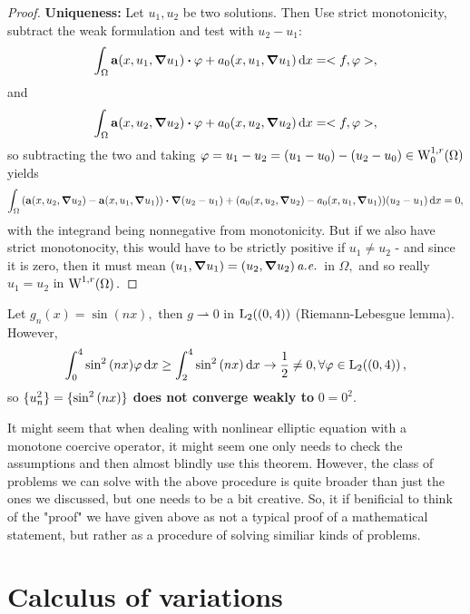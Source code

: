 \documentclass{article}
\begin{document}
\begin{proof}
	\textbf{Uniqueness:} Let $u_1, u_2$ be two solutions. Then Use strict monotonicity, subtract the weak formulation and test with $u_2-u_1$:
	\[
		\int_{\Omega}\vb{a}\qty(x, u_1, \grad u_1)\vdot \varphi + a_0\qty(x, u_1, \grad u_1)\dd{x} = <f, \varphi>,
	\]
	and
	\[
		\int_{\Omega}\vb{a}\qty(x, u_2, \grad u_2)\vdot \varphi + a_0\qty(x, u_2, \grad u_2)\dd{x} = <f, \varphi>,
	\]
so subtracting the two and taking $\varphi = u_1 - u_2 = \qty(u_1 - u_0) - \qty(u_2 - u_0) \in \WkpzeroSet[1][r]{\Omega}$ yields
	\[
		\int_{\Omega}\qty(\vb{a}\qty(x, u_2, \grad u_2)-\vb{a}\qty(x, u_1, \grad u_1))\vdot \grad\qty(u_2 - u_1)+\qty(a_0\qty(x, u_2, \grad u_2)-a_0\qty(x, u_1, \grad u_1))\qty(u_2-u_1)\dd{x} =0,
	\]
	with the integrand being nonnegative from monotonicity. But if we also have strict monotonocity, this would have to be strictly positive if $u_1 \neq u_2$ - and since it is zero, then it must mean $\qty(u_1, \grad u_1) = \qty(u_2, \grad u_2) \, \text{\textit{a.e.}} \,$ in $\Omega,$ and so really $u_1 = u_2$ in $\WkpSet[1][r]{\Omega}.$
\end{proof}
\begin{example}
	Let $g_n(x) = \sin(nx), $ then $g \rightharpoonup 0$ in $\LpSet[2]{(0,4)}$ (Riemann-Lebesgue lemma). However,
	\[
		\int_0^4 \sin^{2}\qty(nx)\varphi \dd{x} \geq \int_2^4 \sin^{2}\qty(nx)\dd{x} \to \frac{1}{2} \neq 0, \forall \varphi \in \LpSet[2]{(0,4)},
	\]
	so $\{u_n^{2}\} = \{\sin^{2}\qty(nx)\}$ \textbf{does not converge weakly to } $0 = 0^{2}$.
\end{example}
\begin{remark}
	It might seem that when dealing with nonlinear elliptic equation with a monotone coercive operator, it might seem one only needs to check the assumptions and then almost blindly use this theorem. However, the class of problems we can solve with the above procedure is quite broader than just the ones we discussed, but one needs to be a bit creative. So, it if benificial to think of the "proof" we have given above as not a typical proof of a mathematical statement, but rather as a procedure of solving similiar kinds of problems.
\end{remark}
\section{Calculus of variations}
\label{sec:calculus_of_variations}
\end{document}
